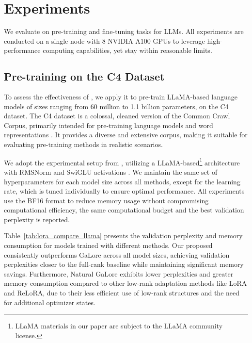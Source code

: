 \section{Experiments}

We evaluate \textit{\lowrank} on pre-training and fine-tuning tasks for LLMs. All experiments are conducted on a single node with 8 NVIDIA A100 GPUs to leverage high-performance computing capabilities, yet stay within reasonable limits.

\subsection{Pre-training on the C4 Dataset}

To assess the effectiveness of \textit{\lowrank}, we apply it to pre-train LLaMA-based language models of sizes ranging from 60 million to 1.1 billion parameters, on the C4 dataset. The C4 dataset is a colossal, cleaned version of the Common Crawl Corpus, primarily intended for pre-training language models and word representations \citep{raffelExploringLimitsTransfer2020}. It provides a diverse and extensive corpus, making it suitable for evaluating pre-training methods in realistic scenarios.

We adopt the experimental setup from \citet{lialinReLoRAHighRankTraining2023}, utilizing a LLaMA-based\footnote[3]{LLaMA materials in our paper are subject to the LLaMA community license.} architecture with RMSNorm and SwiGLU activations \citep{shazeerGLUVariantsImprove2020,touvronLlamaOpenFoundation2023}. We maintain the same set of hyperparameters for each model size across all methods, except for the learning rate, which is tuned individually to ensure optimal performance. All experiments use the BF16 format to reduce memory usage without compromising computational efficiency, the same computational budget and the best validation perplexity is reported.





Table~\ref{tab:lora_compare_llama} presents the validation perplexity and memory consumption for models trained with different methods. Our proposed \textit{\lowrank} consistently outperforms GaLore \citep{zhao2024galore} across all model sizes, achieving validation perplexities closer to the full-rank baseline while maintaining significant memory savings. Furthermore, Natural GaLore exhibits lower perplexities and greater memory consumption compared to other low-rank adaptation methods like LoRA and ReLoRA, due to their less efficient use of low-rank structures and the need for additional optimizer states.

